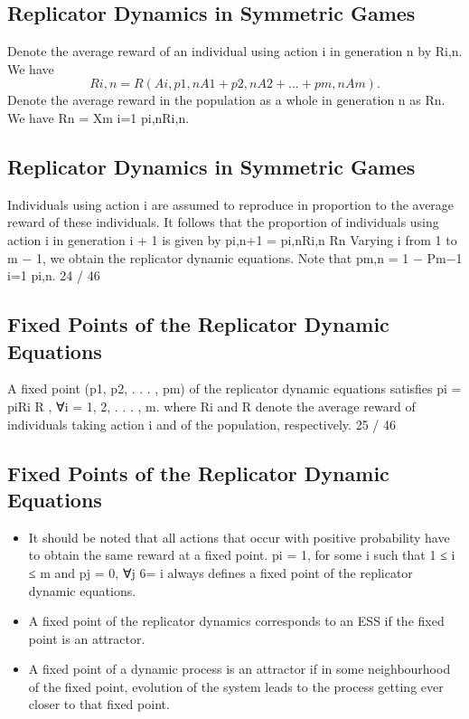 \documentclass[]{report}
\begin{document}
	\subsection{Replicator Dynamics in Symmetric Games}
	Denote the average reward of an individual using action i in
	generation n by Ri,n. We have
\[	Ri,n = R(Ai
	, p1,nA1 + p2,nA2 + . . . + pm,nAm).\]
	Denote the average reward in the population as a whole in
	generation n as Rn. We have
	Rn =
	Xm
	i=1
	pi,nRi,n.
\subsection{Replicator Dynamics in Symmetric Games}
	Individuals using action i are assumed to reproduce in proportion
	to the average reward of these individuals. It follows that the
	proportion of individuals using action i in generation i + 1 is given
	by
	pi,n+1 =
	pi,nRi,n
	Rn
	Varying i from 1 to m − 1, we obtain the replicator dynamic
	equations.
	Note that pm,n = 1 −
	Pm−1
	i=1 pi,n.
	24 / 46
	\subsection{Fixed Points of the Replicator Dynamic Equations}
	A fixed point (p1, p2, . . . , pm) of the replicator dynamic equations
	satisfies
	pi =
	piRi
	R
	, ∀i = 1, 2, . . . , m.
	where Ri and R denote the average reward of individuals taking
	action i and of the population, respectively.
	25 / 46
	\subsection{Fixed Points of the Replicator Dynamic Equations}
	\begin{itemize}
		\item 	It should be noted that all actions that occur with positive
		probability have to obtain the same reward at a fixed point.
		pi = 1, for some i such that 1 ≤ i ≤ m and pj = 0, ∀j 6= i always
		defines a fixed point of the replicator dynamic equations.
		\item A fixed point of the replicator dynamics corresponds to an ESS if
		the fixed point is an attractor.
			\item A fixed point of a dynamic process is an attractor if in some
		neighbourhood of the fixed point, evolution of the system leads to
		the process getting ever closer to that fixed point.
	\end{itemize}

	
\end{document}
